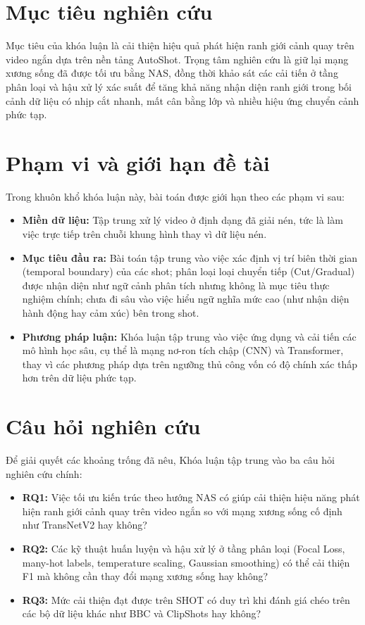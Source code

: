\section{Mục tiêu nghiên cứu}
Mục tiêu của khóa luận là cải thiện hiệu quả phát hiện ranh giới cảnh quay trên video ngắn dựa trên nền tảng AutoShot. Trọng tâm nghiên cứu là giữ lại mạng xương sống đã được tối ưu bằng NAS, đồng thời khảo sát các cải tiến ở tầng phân loại và hậu xử lý xác suất để tăng khả năng nhận diện ranh giới trong bối cảnh dữ liệu có nhịp cắt nhanh, mất cân bằng lớp và nhiều hiệu ứng chuyển cảnh phức tạp.

\section{Phạm vi và giới hạn đề tài}
Trong khuôn khổ khóa luận này, bài toán được giới hạn theo các phạm vi sau:
\begin{itemize}
    \item \textbf{Miền dữ liệu:} Tập trung xử lý video ở định dạng đã giải nén, tức là làm việc trực tiếp trên chuỗi khung hình thay vì dữ liệu nén.
    \item \textbf{Mục tiêu đầu ra:} Bài toán tập trung vào việc xác định vị trí biên thời gian (temporal boundary) của các shot; phân loại loại chuyển tiếp (Cut/Gradual) được nhận diện như ngữ cảnh phân tích nhưng không là mục tiêu thực nghiệm chính; chưa đi sâu vào việc hiểu ngữ nghĩa mức cao (như nhận diện hành động hay cảm xúc) bên trong shot.
    \item \textbf{Phương pháp luận:} Khóa luận tập trung vào việc ứng dụng và cải tiến các mô hình học sâu, cụ thể là mạng nơ-ron tích chập (CNN) và Transformer, thay vì các phương pháp dựa trên ngưỡng thủ công vốn có độ chính xác thấp hơn trên dữ liệu phức tạp.
\end{itemize}

\section{Câu hỏi nghiên cứu}
\label{sec:research_questions}
Để giải quyết các khoảng trống đã nêu, Khóa luận tập trung vào ba câu hỏi nghiên cứu chính:
\begin{itemize}
    \item \textbf{RQ1:} Việc tối ưu kiến trúc theo hướng NAS có giúp cải thiện hiệu năng phát hiện ranh giới cảnh quay trên video ngắn so với mạng xương sống cố định như TransNetV2 hay không?
    \item \textbf{RQ2:} Các kỹ thuật huấn luyện và hậu xử lý ở tầng phân loại (Focal Loss, many-hot labels, temperature scaling, Gaussian smoothing) có thể cải thiện F1 mà không cần thay đổi mạng xương sống hay không?
    \item \textbf{RQ3:} Mức cải thiện đạt được trên SHOT có duy trì khi đánh giá chéo trên các bộ dữ liệu khác như BBC và ClipShots hay không?
\end{itemize}

